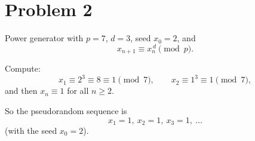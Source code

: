 \section*{Problem 2}

Power generator with \(p=7\), \(d=3\), seed \(x_0=2\), and
\[
x_{n+1}\equiv x_n^{\,d}\pmod p.
\]

Compute:
\[
x_1\equiv 2^3\equiv 8\equiv 1\pmod 7,\qquad
x_2\equiv 1^3\equiv 1\pmod 7,
\]
and then \(x_n\equiv 1\) for all \(n\ge 2\).

So the pseudorandom sequence is
\[
\boxed{x_1=1,\ x_2=1,\ x_3=1,\ \ldots}
\]
(with the seed \(x_0=2\)).
